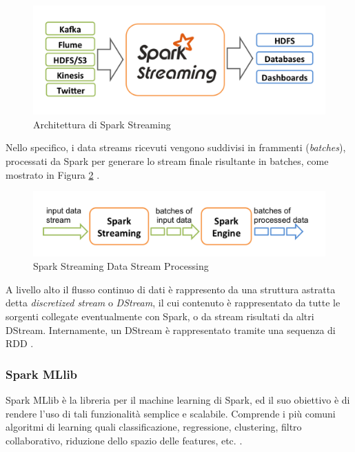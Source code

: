 \documentclass[11pt]{article}
\begin{document}
\begin{figure}[H]
	\centering
	\includegraphics[scale=0.50]{images/streaming-arch.png}
	\caption{Architettura di Spark Streaming \cite{spark}}
	\label{spark-streaming}
\end{figure}

Nello specifico, i data streams ricevuti vengono suddivisi in frammenti (\textit{batches}), processati da Spark per generare lo stream finale risultante in batches, come mostrato in Figura \ref{spark-streaming-processing} \cite{spark}.

\begin{figure}[H]
	\centering
	\includegraphics[scale=0.50]{images/streaming-flow.png}
	\caption{Spark Streaming Data Stream Processing \cite{spark}}
	\label{spark-streaming-processing}
\end{figure}

A livello alto il flusso continuo di dati è rappresento da una struttura astratta detta \textit{discretized stream} o \textit{DStream}, il cui contenuto è rappresentato da tutte le sorgenti collegate eventualmente con Spark, o da stream risultati da altri DStream. Internamente, un DStream è rappresentato tramite una sequenza di RDD \cite{spark}. 

\subsubsection{Spark MLlib}

Spark MLlib è la libreria per il machine learning di Spark, ed il suo obiettivo è di rendere l'uso di tali funzionalità semplice e scalabile. Comprende i più comuni algoritmi di learning quali classificazione, regressione, clustering, filtro collaborativo, riduzione dello spazio delle features, etc. \cite{spark}. 
\end{document}
